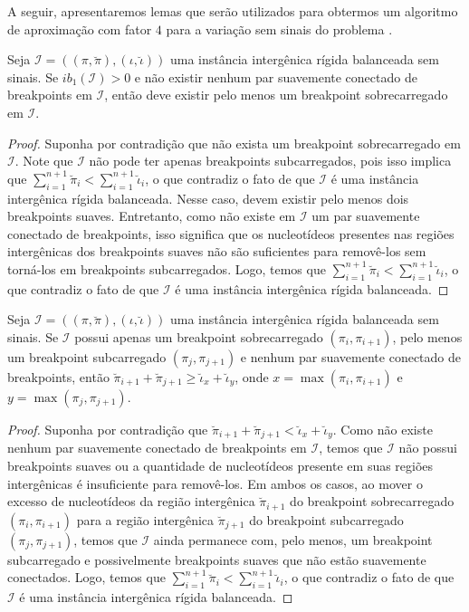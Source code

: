 A seguir, apresentaremos lemas que serão utilizados para obtermos um algoritmo de aproximação com fator $4$ para a variação sem sinais do problema \SbIRT{}.

\begin{lemma}\label{lemma:XPQZERDR}
Seja $\mathcal{I} = ((\pi,\breve\pi),(\iota,\breve\iota))$ uma instância intergênica rígida balanceada sem sinais. Se $ib_1(\mathcal{I}) > 0$ e não existir nenhum par suavemente conectado de breakpoints em $\mathcal{I}$, então deve existir pelo menos um breakpoint sobrecarregado em $\mathcal{I}$.
\end{lemma}
\begin{proof}
Suponha por contradição que não exista um breakpoint sobrecarregado em $\mathcal{I}$. Note que $\mathcal{I}$ não pode ter apenas breakpoints subcarregados, pois isso implica que $\sum_{i=1}^{n+1}\breve\pi_i < \sum_{i=1}^{n+1}\breve\iota_i$, o que contradiz o fato de que $\mathcal{I}$ é uma instância intergênica rígida balanceada. Nesse caso, devem existir pelo menos dois breakpoints suaves. Entretanto, como não existe em  $\mathcal{I}$ um par suavemente conectado de breakpoints, isso significa que os nucleotídeos presentes nas regiões intergênicas dos breakpoints suaves não são suficientes para removê-los sem torná-los em breakpoints subcarregados. Logo, temos que $\sum_{i=1}^{n+1}\breve\pi_i < \sum_{i=1}^{n+1}\breve\iota_i$, o que contradiz o fato de que $\mathcal{I}$ é uma instância intergênica rígida balanceada.
\end{proof}

\begin{lemma}\label{lemma:DWXIBBXO}
Seja $\mathcal{I} = ((\pi,\breve\pi),(\iota,\breve\iota))$ uma instância intergênica rígida balanceada sem sinais. Se $\mathcal{I}$ possui apenas um breakpoint sobrecarregado $(\pi_i,\pi_{i+1})$, pelo menos um breakpoint subcarregado $(\pi_j,\pi_{j+1})$ e nenhum par suavemente conectado de breakpoints, então $\breve\pi_{i+1} + \breve\pi_{j+1} \ge \breve\iota_{x} + \breve\iota_{y}$, onde $x = \max(\pi_i,\pi_{i+1})$ e $y=\max(\pi_j,\pi_{j+1})$.
\end{lemma}
\begin{proof}
Suponha por contradição que $\breve\pi_{i+1} + \breve\pi_{j+1} < \breve\iota_{x} + \breve\iota_{y}$. Como não existe nenhum par suavemente conectado de breakpoints em $\mathcal{I}$, temos que $\mathcal{I}$ não possui breakpoints suaves ou a quantidade de nucleotídeos presente em suas regiões intergênicas é insuficiente para removê-los. Em ambos os casos, ao mover o excesso de nucleotídeos da região intergênica $\breve\pi_{i+1}$ do breakpoint sobrecarregado $(\pi_i,\pi_{i+1})$ para a região intergênica $\breve\pi_{j+1}$ do breakpoint subcarregado $(\pi_j,\pi_{j+1})$, temos que $\mathcal{I}$ ainda permanece com, pelo menos, um breakpoint subcarregado e possivelmente breakpoints suaves que não estão suavemente conectados. Logo, temos que $\sum_{i=1}^{n+1}\breve\pi_i < \sum_{i=1}^{n+1}\breve\iota_i$, o que contradiz o fato de que $\mathcal{I}$ é uma instância intergênica rígida balanceada.
\end{proof}

